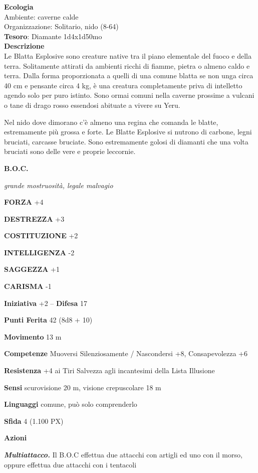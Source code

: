 \begin{multicols}{2}
\textbf{Ecologia}\\
Ambiente: caverne calde\\
Organizzazione: Solitario, nido (8-64)\\
\textbf{Tesoro}: Diamante 1d4x1d50mo\\
\textbf{Descrizione}\\
Le Blatta Esplosive sono creature native tra il piano elementale del fuoco e della terra. Solitamente attirati da ambienti ricchi di fiamme, pietra o almeno caldo e terra.
Dalla forma proporzionata a quelli di una comune blatta se non unga circa 40 cm e pensante circa 4 kg, è una creatura completamente priva di intelletto agendo solo per puro istinto.
Sono ormai comuni nella caverne prossime a vulcani o tane di drago rosso essendosi abituate a vivere su Yeru.

Nel nido dove dimorano c'è almeno una regina che comanda le blatte, estremamente più grossa e forte. Le Blatte Esplosive si nutrono di carbone, legni bruciati, carcasse bruciate. Sono estremamente golosi di diamanti che una volta bruciati sono delle vere e proprie leccornie.

\medskip{}\textbf{B.O.C.}

\textit{grande mostruosità, legale malvagio}

\textbf{FORZA} +4

\textbf{DESTREZZA} +3

\textbf{COSTITUZIONE} +2

\textbf{INTELLIGENZA} -2

\textbf{SAGGEZZA} +1

\textbf{CARISMA} -1

\textbf{Iniziativa} +2 -- \textbf{Difesa} 17

\textbf{Punti Ferita} 42 (8d8 + 10)

\textbf{Movimento} 13 m

\textbf{Competenze} Muoversi Silenziosamente / Nascondersi +8, Consapevolezza +6

\textbf{Resistenza} +4 ai Tiri Salvezza agli incantesimi della Lista Illusione

\textbf{Sensi} scurovisione 20 m, visione crepuscolare 18 m

\textbf{Linguaggi} comune, può solo comprenderlo

\textbf{Sfida} 4 (1.100 PX)

\textbf{Azioni}

\textit{\textbf{Multiattacco.}} Il B.O.C effettua due attacchi con artigli ed uno con il morso, oppure effettua due attacchi con i tentacoli


\end{multicols}
